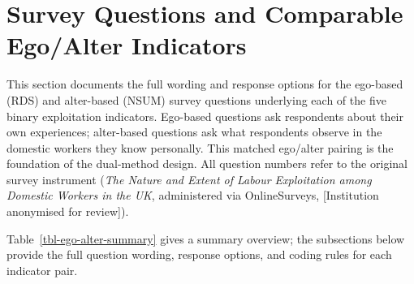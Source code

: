 \documentclass[
  12pt,
  letterpaper,
  DIV=11,
  numbers=noendperiod]{scrreprt}
\begin{document}
\chapter{Survey Questions and Comparable Ego/Alter
Indicators}\label{sec-b}

This section documents the full wording and response options for the
ego-based (RDS) and alter-based (NSUM) survey questions underlying each
of the five binary exploitation indicators. Ego-based questions ask
respondents about their own experiences; alter-based questions ask what
respondents observe in the domestic workers they know personally. This
matched ego/alter pairing is the foundation of the dual-method design.
All question numbers refer to the original survey instrument (\emph{The
Nature and Extent of Labour Exploitation among Domestic Workers in the
UK}, administered via OnlineSurveys, {[}Institution anonymised for
review{]}).

Table~\ref{tbl-ego-alter-summary} gives a summary overview; the
subsections below provide the full question wording, response options,
and coding rules for each indicator pair.
\end{document}
